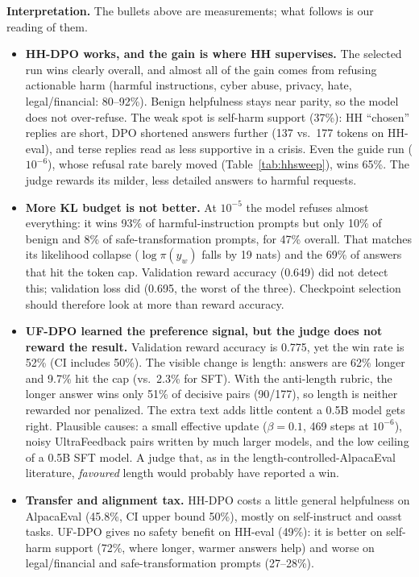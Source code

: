 \documentclass[10pt]{article}
\begin{document}
\textbf{Interpretation.} The bullets above are measurements; what follows is our reading of them.
\begin{itemize}
\item \textbf{HH-DPO works, and the gain is where HH supervises.} The selected run wins clearly overall, and almost all of the gain comes
from refusing actionable harm (harmful instructions, cyber abuse, privacy, hate, legal/financial: 80--92\%). Benign
helpfulness stays near parity, so the model does not over-refuse. The weak spot is self-harm support (37\%): HH ``chosen''
replies are short, DPO shortened answers further (137 vs.\ 177 tokens on HH-eval), and terse replies read as less supportive in a
crisis. Even the guide run ($10^{-6}$), whose refusal rate barely moved (Table~\ref{tab:hhsweep}), wins 65\%. The judge rewards its
milder, less detailed answers to harmful requests.
\item \textbf{More KL budget is not better.} At $10^{-5}$ the model refuses almost everything: it wins 93\% of harmful-instruction
prompts but only 10\% of benign and 8\% of safe-transformation prompts, for 47\% overall. That matches its likelihood collapse
($\log\pi(y_w)$ falls by 19 nats) and the 69\% of answers that hit the token cap. Validation reward accuracy (0.649) did not detect
this; validation loss did (0.695, the worst of the three). Checkpoint selection should therefore look at more than reward accuracy.
\item \textbf{UF-DPO learned the preference signal, but the judge does not reward the result.} Validation reward accuracy is 0.775,
yet the win rate is 52\% (CI includes 50\%). The visible change is length: answers are 62\% longer and 9.7\% hit the cap
(vs.\ 2.3\% for SFT). With the anti-length rubric, the longer answer wins only 51\% of decisive pairs (90/177), so length is neither
rewarded nor penalized. The extra text adds little content a 0.5B model gets right. Plausible causes: a small effective update
($\beta{=}0.1$, 469 steps at $10^{-6}$), noisy UltraFeedback pairs written by much larger models, and the low ceiling of a 0.5B
SFT model. A judge that, as in the length-controlled-AlpacaEval literature, \emph{favoured} length would probably have reported a
win.
\item \textbf{Transfer and alignment tax.} HH-DPO costs a little general helpfulness on AlpacaEval (45.8\%, CI upper bound 50\%), mostly on
self-instruct and oasst tasks. UF-DPO gives no safety benefit on HH-eval (49\%): it is better on self-harm support (72\%, where longer,
warmer answers help) and worse on legal/financial and safe-transformation prompts (27--28\%).

\end{itemize}
\end{document}

